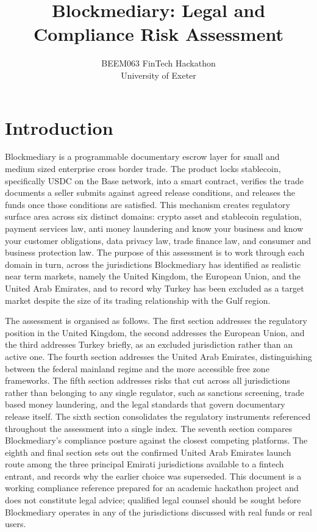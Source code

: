 \documentclass[12pt, a4paper]{article}
\title{\textbf{Blockmediary: Legal and Compliance Risk Assessment}}
\author{}
\date{BEEM063 FinTech Hackathon \\ University of Exeter}
\begin{document}
\maketitle
\newpage

\section*{Introduction}

Blockmediary is a programmable documentary escrow layer for small and medium sized
enterprise cross border trade. The product locks stablecoin, specifically USDC on the
Base network, into a smart contract, verifies the trade documents a seller submits
against agreed release conditions, and releases the funds once those conditions are
satisfied. This mechanism creates regulatory surface area across six distinct domains:
crypto asset and stablecoin regulation, payment services law, anti money laundering and
know your business and know your customer obligations, data privacy law, trade finance
law, and consumer and business protection law. The purpose of this assessment is to work
through each domain in turn, across the jurisdictions Blockmediary has identified as
realistic near term markets, namely the United Kingdom, the European Union, and the
United Arab Emirates, and to record why Turkey has been excluded as a target market
despite the size of its trading relationship with the Gulf region.

The assessment is organised as follows. The first section addresses the regulatory
position in the United Kingdom, the second addresses the European Union, and the third
addresses Turkey briefly, as an excluded jurisdiction rather than an active one. The
fourth section addresses the United Arab Emirates, distinguishing between the federal
mainland regime and the more accessible free zone frameworks. The fifth section addresses
risks that cut across all jurisdictions rather than belonging to any single regulator, such
as sanctions screening, trade based money laundering, and the legal standards that govern
documentary release itself. The sixth section consolidates the regulatory instruments
referenced throughout the assessment into a single index. The seventh section compares
Blockmediary's compliance posture against the closest competing platforms. The eighth and
final section sets out the confirmed United Arab Emirates launch route among the three
principal Emirati jurisdictions available to a fintech entrant, and records why the
earlier choice was superseded. This document is a working compliance reference prepared
for an academic hackathon project and does not constitute legal advice; qualified legal
counsel should be sought before Blockmediary operates in any of the jurisdictions discussed
with real funds or real users.
\end{document}
